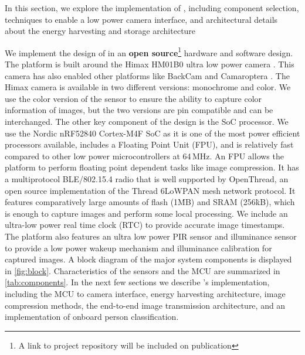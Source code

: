 
In this section, we explore the implementation of \namec{}, including component selection, techniques to enable a low power camera interface, and architectural details about the energy harvesting and storage architecture

We implement the design of \namec{} in an \textbf{open source}\footnote{A link to project repository will be included on publication} hardware and software design. The platform is built around the Himax HM01B0 ultra low power camera \cite{hm01b0}. This camera has also enabled other platforms like BackCam \cite{josephson2019wireless} and Camaroptera \cite{nardello2019camaroptera}. The Himax camera is available in two different versions: monochrome and color. We use the color version of the sensor to ensure the ability to capture color information of images, but the two versions are pin compatible and can be interchanged. The other key component of the design is the SoC processor. We use the Nordic nRF52840 Cortex-M4F SoC as it is one of the most power efficient processors available, includes a Floating Point Unit (FPU), and is relatively fast compared to other low power microcontrollers at 64\,MHz. An FPU allows the platform to perform floating point dependent tasks like image compression. It has a multiprotocol BLE/802.15.4 radio that is well supported by OpenThread, an open source implementation of the Thread 6LoWPAN mesh network protocol. It features comparatively large amounts of flash (1\.MB) and SRAM (256\.kB), which is enough to capture images and perform some local processing. We include an ultra-low power real time clock (RTC) to provide accurate image timestamps. The platform also features an ultra low power PIR sensor and illuminance sensor to provide a low power wakeup mechanism and illuminance calibration for captured images. A block diagram of the major system components is displayed in \cref{fig:block}. Characteristics of the sensors and the MCU are summarized in \cref{tab:components}. In the next few sections we describe \namec{}'s implementation, including the MCU to camera interface, energy harvesting architecture, image compression methods, the end-to-end image transmission architecture, and an implementation of onboard person classification.

